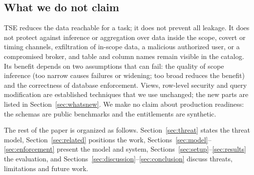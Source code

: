 \subsection{What we do not claim}
TSE reduces the data reachable for a task; it does not prevent all leakage. It does not protect against inference or
aggregation over data inside the scope, covert or timing channels, exfiltration of in-scope data, a malicious
authorized user, or a compromised broker, and table and column names remain visible in the catalog. Its benefit
depends on two assumptions that can fail: the quality of scope inference (too narrow causes failures or widening;
too broad reduces the benefit) and the correctness of database enforcement. Views, row-level security and query
modification are established techniques that we use unchanged; the new parts are listed in
Section~\ref{sec:whatsnew}. We make no claim about production readiness: the schemas are public benchmarks and the
entitlements are synthetic.

The rest of the paper is organized as follows. Section~\ref{sec:threat} states the threat model,
Section~\ref{sec:related} positions the work, Sections~\ref{sec:model}--\ref{sec:enforcement} present the model and
system, Sections~\ref{sec:setup}--\ref{sec:results} the evaluation, and Sections~\ref{sec:discussion}--\ref{sec:conclusion}
discuss threats, limitations and future work.
